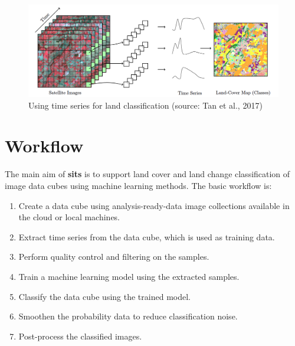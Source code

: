 \documentclass[a4paper,]{tufte-book}
\providecommand{\tightlist}{%
  \setlength{\itemsep}{0pt}\setlength{\parskip}{0pt}}
\begin{document}
\begin{figure}

{\centering \includegraphics[width=0.8\linewidth,height=0.8\textheight]{images/time_series_general_view} 

}

\caption[Using time series for land classification (source]{Using time series for land classification (source: Tan et al., 2017)}\label{fig:unnamed-chunk-5}
\end{figure}

\hypertarget{workflow}{%
\section{Workflow}\label{workflow}}

The main aim of \textbf{sits} is to support land cover and land change classification of image data cubes using machine learning methods. The basic workflow is:

\begin{enumerate}
\def\labelenumi{\arabic{enumi}.}
\tightlist
\item
  Create a data cube using analysis-ready-data image collections available in the cloud or local machines.
\item
  Extract time series from the data cube, which is used as training data.
\item
  Perform quality control and filtering on the samples.
\item
  Train a machine learning model using the extracted samples.
\item
  Classify the data cube using the trained model.
\item
  Smoothen the probability data to reduce classification noise.
\item
  Post-process the classified images.
\end{enumerate}
\end{document}
